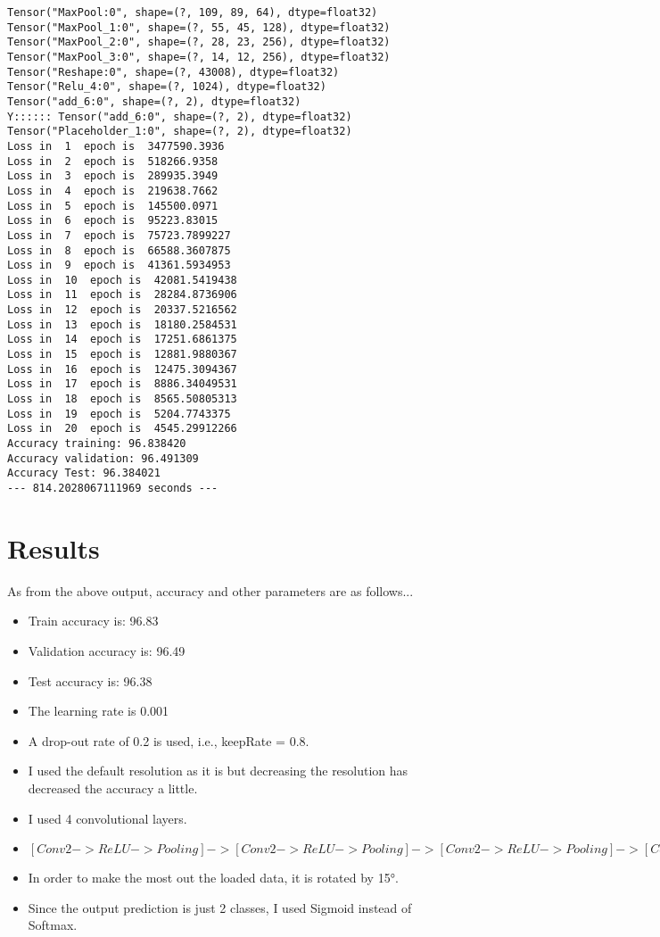 \documentclass[a4paper,11pt]{article}
\begin{document}
\begin{lstlisting}[label={list:fifth},caption=Code output.]
Tensor("MaxPool:0", shape=(?, 109, 89, 64), dtype=float32)
Tensor("MaxPool_1:0", shape=(?, 55, 45, 128), dtype=float32)
Tensor("MaxPool_2:0", shape=(?, 28, 23, 256), dtype=float32)
Tensor("MaxPool_3:0", shape=(?, 14, 12, 256), dtype=float32)
Tensor("Reshape:0", shape=(?, 43008), dtype=float32)
Tensor("Relu_4:0", shape=(?, 1024), dtype=float32)
Tensor("add_6:0", shape=(?, 2), dtype=float32)
Y:::::: Tensor("add_6:0", shape=(?, 2), dtype=float32)
Tensor("Placeholder_1:0", shape=(?, 2), dtype=float32)
Loss in  1  epoch is  3477590.3936
Loss in  2  epoch is  518266.9358
Loss in  3  epoch is  289935.3949
Loss in  4  epoch is  219638.7662
Loss in  5  epoch is  145500.0971
Loss in  6  epoch is  95223.83015
Loss in  7  epoch is  75723.7899227
Loss in  8  epoch is  66588.3607875
Loss in  9  epoch is  41361.5934953
Loss in  10  epoch is  42081.5419438
Loss in  11  epoch is  28284.8736906
Loss in  12  epoch is  20337.5216562
Loss in  13  epoch is  18180.2584531
Loss in  14  epoch is  17251.6861375
Loss in  15  epoch is  12881.9880367
Loss in  16  epoch is  12475.3094367
Loss in  17  epoch is  8886.34049531
Loss in  18  epoch is  8565.50805313
Loss in  19  epoch is  5204.7743375
Loss in  20  epoch is  4545.29912266
Accuracy training: 96.838420
Accuracy validation: 96.491309
Accuracy Test: 96.384021
--- 814.2028067111969 seconds ---
\end{lstlisting}

\section*{Results}

As from the above output, accuracy and other parameters are as follows...
\begin{itemize}
	\item Train accuracy is: 96.83
	\item Validation accuracy is: 96.49
	\item Test accuracy is: 96.38
	\item The learning rate is 0.001
	\item A drop-out rate of 0.2 is used, i.e., keepRate = 0.8.
	\item I used the default resolution as it is but decreasing the resolution has decreased the accuracy a little.
	\item I used 4 convolutional layers.
	\item $[Conv2 -> ReLU -> Pooling] -> [Conv2 -> ReLU -> Pooling] -> [Conv2 -> ReLU -> Pooling] -> [Conv2 -> ReLU -> Pooling] -> [FC -> FC] -> FC$
	\item In order to make the most out the loaded data, it is rotated by \ang{15}.
	\item Since the output prediction is just 2 classes, I used Sigmoid instead of Softmax.
\end{itemize}
\end{document}
